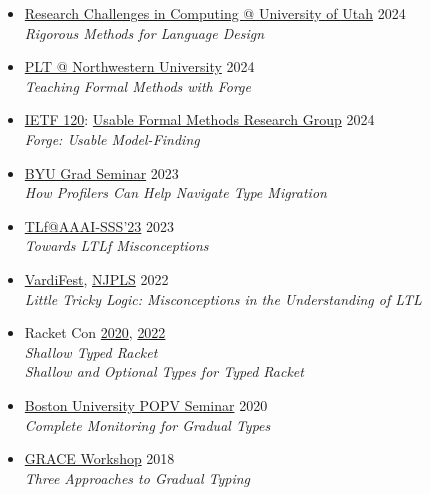 \documentclass[11pt]{article}
\begin{document}
\begin{itemize}
  \item
    \href{https://www.cs.utah.edu/calendar/research-challenges-in-computing-5/}{Research Challenges in Computing @ University of Utah} \hfill 2024 \\
    \emph{Rigorous Methods for Language Design}
  \item
    \href{https://plt.cs.northwestern.edu/}{PLT @ Northwestern University} \hfill 2024 \\
    \emph{Teaching Formal Methods with Forge}
  \item
    \href{https://www.ietf.org/meeting/120/}{IETF 120}: \href{https://datatracker.ietf.org/meeting/120/materials/agenda-120-ufmrg-03}{Usable Formal Methods Research Group} \hfill 2024 \\
    \emph{Forge: Usable Model-Finding}
  \item
    \href{https://cs.byu.edu/events/seminar-series/}{BYU Grad Seminar} \hfill 2023 \\
    \emph{How Profilers Can Help Navigate Type Migration}
  \item
    \href{https://ltlf-symposium.github.io/}{TLf@AAAI-SSS'23} \hfill 2023 \\
    \emph{Towards LTLf Misconceptions}
  \item
    \href{https://vardifest.github.io}{VardiFest}, \href{http://njpls.org/oct22.html}{NJPLS} \hfill 2022\\
    \emph{Little Tricky Logic: Misconceptions in the Understanding of LTL}
  \item
    Racket Con \hfill \href{https://con.racket-lang.org/2020}{2020}, \href{https://con.racket-lang.org/2022}{2022}\\
    \emph{Shallow Typed Racket} \\
    \emph{Shallow and Optional Types for Typed Racket}
  \item
    \href{https://www.bu.edu/cs/research/popv/seminar/}{Boston University POPV Seminar} \hfill {2020}\\
    \emph{Complete Monitoring for Gradual Types}
  \item
    \href{https://2018.splashcon.org/track/grace-2018-papers}{GRACE Workshop} \hfill 2018\\
    \emph{Three Approaches to Gradual Typing}
\end{itemize}
\end{document}
